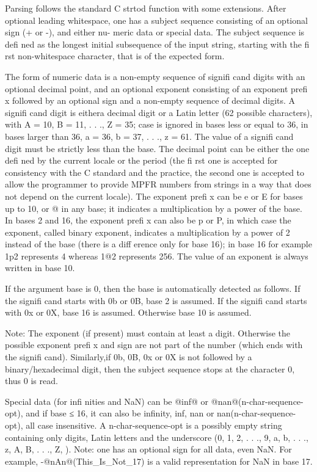 Parsing follows the standard C strtod function with some extensions. After optional leading
whitespace, one has a subject sequence consisting of an optional sign (+ or -), and either nu-
meric data or special data. The subject sequence is defi ned as the longest initial subsequence
of the input string, starting with the fi rst non-whitespace character, that is of the expected
form.

The form of numeric data is a non-empty sequence of signifi cand digits with an optional
decimal point, and an optional exponent consisting of an exponent prefi x followed by an
optional sign and a non-empty sequence of decimal digits. A signifi cand digit is eithera
decimal digit or a Latin letter (62 possible characters), with A = 10, B = 11, . . ., Z = 35;
case is ignored in bases less or equal to 36, in bases larger than 36, a = 36, b = 37, . . ., z
= 61. The value of a signifi cand digit must be strictly less than the base. The decimal point
can be either the one defi ned by the current locale or the period (the fi rst one is accepted
for consistency with the C standard and the practice, the second one is accepted to allow the
programmer to provide MPFR numbers from strings in a way that does not depend on the
current locale). The exponent prefi x can be e or E for bases up to 10, or @ in any base; it
indicates a multiplication by a power of the base. In bases 2 and 16, the exponent prefi x can
also be p or P, in which case the exponent, called binary exponent, indicates a multiplication
by a power of 2 instead of the base (there is a diff erence only for base 16); in base 16 for
example 1p2 represents 4 whereas 1@2 represents 256. The value of an exponent is always
written in base 10.

If the argument base is 0, then the base is automatically detected as follows. If the signifi cand
starts with 0b or 0B, base 2 is assumed. If the signifi cand starts with 0x or 0X, base 16 is
assumed. Otherwise base 10 is assumed.

Note: The exponent (if present) must contain at least a digit. Otherwise the possible exponent
prefi x and sign are not part of the number (which ends with the signifi cand). Similarly,if 0b,
0B, 0x or 0X is not followed by a binary/hexadecimal digit, then the subject sequence stops
at the character 0, thus 0 is read.

Special data (for infi nities and NaN) can be @inf@ or @nan@(n-char-sequence-opt), and
if base ≤ 16, it can also be infinity, inf, nan or nan(n-char-sequence-opt), all case
insensitive. A n-char-sequence-opt is a possibly empty string containing only digits, Latin
letters and the underscore (0, 1, 2, . . ., 9, a, b, . . ., z, A, B, . . ., Z, ). Note: one has
an optional sign for all data, even NaN. For example, -@nAn@(This\_Is\_Not\_17) is a valid
representation for NaN in base 17.



